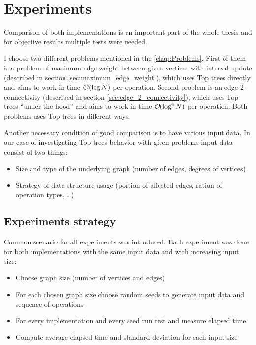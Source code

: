 \chapter{Experiments}
\label{chap:Experiments}

Comparison of both implementations is an important part of the whole thesis
and for objective results multiple tests were needed.

I choose two different problems mentioned in the \cref{chap:Problems}.
First of them is a problem of maximum edge weight between given vertices with
interval update (described in section \ref{sec:maximum_edge_weight}), which uses
Top trees directly and aims to work in time ${\cal O}(\log N)$ per operation. Second
problem is an edge 2-connectivity (described in section \ref{sec:edge_2_connectivity}),
which uses Top trees ``under the hood'' and aims to work in time ${\cal O}(\log^4 N)$
per operation. Both problems uses Top trees in different ways.

Another necessary condition of good comparison is to have various input data. In
our case of investigating Top trees behavior with given problems input data
consist of two things:
\begin{itemize}
\item Size and type of the underlying graph (number of edges, degrees of vertices)
\item Strategy of data structure usage (portion of affected edges, ration of
operation types, \dots)
\end{itemize}

\section{Experiments strategy}

Common scenario for all experiments was introduced. Each experiment was done
for both implementations with the same input data and with increasing input
size:

\begin{itemize}
\item Choose graph size (number of vertices and edges)
\item For each chosen graph size choose random seeds to generate input data and
sequence of operations
\item For every implementation and every seed run test and measure elapsed time
\item Compute average elapsed time and standard deviation for each input size
\end{itemize}

